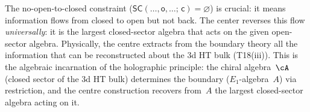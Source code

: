 \begin{remark}
\label{rem:open-closed-center}
The no-open-to-closed constraint
($\mathsf{SC}(\ldots,\mathsf{o},\ldots;\, \mathsf{c}) = \varnothing$)
is crucial: it means information flows from closed to open but not
back. The center reverses this flow \emph{universally}: it is the
largest closed-sector algebra that acts on the given open-sector
algebra. Physically, the centre extracts from the boundary theory
all the information that can be reconstructed about the $3$d HT
bulk (T18(iii)). This is the algebraic incarnation of the holographic
principle: the chiral algebra~$\cA$ (closed sector of the $3$d HT
bulk) determines the boundary ($E_1$-algebra~$A$) via restriction,
and the centre construction recovers from~$A$ the largest
closed-sector algebra acting on it.
\end{remark}

